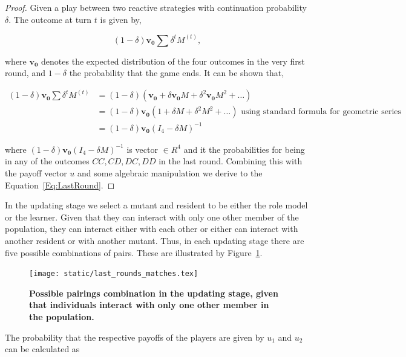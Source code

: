\documentclass[11pt]{article}
\theoremstyle{plainCl1}
\theoremstyle{plainCl2}
\begin{document}
\begin{proof}
Given a play between two reactive strategies with continuation probability
$\delta$. The outcome at turn \(t\) is given by,

\begin{equation}\label{eq:}
  (1 - \delta) \mathbf{v_0} \sum \delta^{t} M^{(t)},
\end{equation}

where $\mathbf{v_0}$ denotes the expected distribution of the four outcomes in
the very first round, and \(1- \delta\) the probability that the game ends.
It can be shown that,

\begin{align*}
  (1 - \delta) \mathbf{v_0} \sum \delta^{t} M^{(t)} & = (1 - \delta)(\mathbf{v_0} + \delta \mathbf{v_0} M + \delta^{2}\mathbf{v_0} M ^{2} + \dots )\\ 
   & = (1 - \delta)\mathbf{v_0} (1 + \delta M + \delta^{2}M ^{2} + \dots ) \text{ using standard formula for geometric series}\\ 
   & = (1 - \delta)\mathbf{v_0}(I_4 - \delta M)^{-1}
\end{align*}

where \((1 - \delta)\mathbf{v_0}(I_4 - \delta M)^{-1}\) is vector \(\in R^{4}\)
and it the probabilities for being in any of the outcomes \(CC, CD, DC, DD\) in
the last round. Combining this with the payoff vector \(u\) and some algebraic
manipulation we derive to the Equation~\ref{Eq:LastRound}.
\end{proof}

In the updating stage we select a mutant and resident to be either the role
model or the learner. Given that they can interact with only one other member of
the population, they can interact either with each other or either can interact
with another resident or with another mutant. Thus, in each updating stage there
are five possible combinations of pairs. These are illustrated by
Figure~\ref{fig:single_pairs}.

\begin{figure}[!htbp]
  \centering
  \texttt{[image: static/last\_rounds\_matches.tex]}
  \caption{\textbf{Possible pairings combination in the updating stage, given
  that individuals interact with only one other member in the population.}}
  \label{fig:single_pairs}
\end{figure}

The probability that the respective payoffs of the players
are given by $u_1$ and $u_2$ can be calculated as
\end{document}
